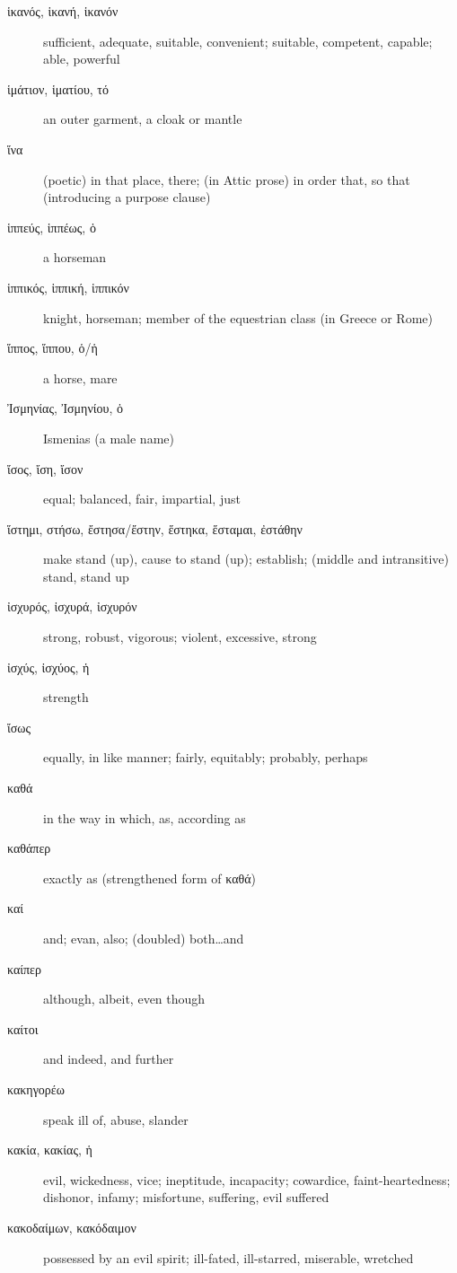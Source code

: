\documentclass[12pt,letterpaper]{article}
\begin{document}
\begin{description}
    \item[\textgreek{ἱκανός, ἱκανή, ἱκανόν}] \marginnote{*}sufficient, adequate, suitable, convenient; suitable, competent, capable; able, powerful
    \item[\textgreek{ἱμάτιον, ἱματίου, τό}] an outer garment, a cloak or mantle
    \item[\textgreek{ἵνα}] \marginnote{*}(poetic) in that place, there; (in Attic prose) in order that, so that (introducing a purpose clause)
    \item[\textgreek{ἱππεύς, ἱππέως, ὁ}] \marginnote{*}a horseman
    \item[\textgreek{ἱππικός, ἱππική, ἱππικόν}] knight, horseman; member of the equestrian class (in Greece or Rome)
    \item[\textgreek{ἵππος, ἵππου, ὁ/ἡ}] \marginnote{*}a horse, mare
    \item[\textgreek{Ἰσμηνίας, Ἰσμηνίου, ὁ}] Ismenias (a male name)
    \item[\textgreek{ἴσος, ἴση, ἴσον}] \marginnote{*}equal; balanced, fair, impartial, just
    \item[\textgreek{ἵστημι, στήσω, ἔστησα/ἔστην, ἕστηκα, ἕσταμαι, ἐστάθην}] \marginnote{*}make stand (up), cause to stand (up); establish; (middle and intransitive) stand, stand up
    \item[\textgreek{ἰσχυρός, ἰσχυρά, ἰσχυρόν}] \marginnote{*}strong, robust, vigorous; violent, excessive, strong
    \item[\textgreek{ἰσχύς, ἰσχύος, ἡ}] strength
    \item[\textgreek{ἴσως}] \marginnote{*}equally, in like manner; fairly, equitably; probably, perhaps
    \item[\textgreek{καθά}] in the way in which, as, according as
    \item[\textgreek{καθάπερ}] exactly as (strengthened form of \textgreek{καθά})
    \item[\textgreek{καί}] \marginnote{*}and; evan, also; (doubled) both\dots and
    \item[\textgreek{καίπερ}] although, albeit, even though
    \item[\textgreek{καίτοι}] \marginnote{*}and indeed, and further
    \item[\textgreek{κακηγορέω}] speak ill of, abuse, slander
    \item[\textgreek{κακία, κακίας, ἡ}] evil, wickedness, vice; ineptitude, incapacity; cowardice, faint-heartedness; dishonor, infamy; misfortune, suffering, evil suffered
    \item[\textgreek{κακοδαίμων, κακόδαιμον}] possessed by an evil spirit; ill-fated, ill-starred, miserable, wretched

\end{description}
\end{document}
